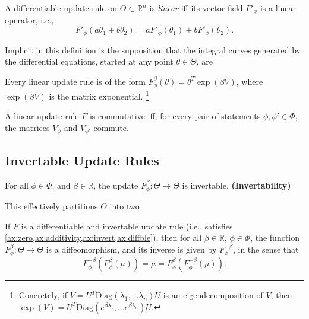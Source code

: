 \documentclass{article}
\begin{document}
\begin{defn}\label{ax:linear}
    A differentiable update rule on $\Theta \subset \mathbb R^n$ is \emph{linear} iff its vector field $F'_\phi$ is a linear operator, i.e., 
    \[ F'_\phi(a \theta_1 + b \theta_2) = a F'_\phi(\theta_1) + b F'_\phi(\theta_2). \]
\end{defn}

Implicit in this definition is the supposition that the integral curves generated by the differential equations, started at any point $\theta \in \Theta$, are 


\begin{prop}
    Every linear update rule is of the form
    $
        F^{\beta}_\phi(\theta) =  \theta^{T} \exp(\beta V)
    $,
    where $\exp(\beta V)$ is the matrix exponential.%
        \footnote{Concretely, if $V = U^T \mathrm{Diag}(\lambda_1, \ldots \lambda_n) U$ is an eigendecomposition of $V$, then $\exp(V) = U^T \mathrm{Diag}(e^{\beta\lambda_1}, \ldots e^{\beta\lambda_n}) U$.}
\end{prop}

\begin{prop}
    A linear update rule $F$ is commutative iff, for every pair of statements  $\phi, \phi' \in \Phi$, the
    matrices $V_\phi$ and $V_{\phi'}$ commute.
\end{prop}



\subsection{Invertable Update Rules}
\begin{URaxioms}
    \item For all $\phi\in\Phi$, and $\beta \in \mathbb R$, the update
    $F^{\beta}_{\phi}: \Theta \to \Theta$ is invertable.
    \hfill\textbf{(Invertability)} \label{ax:invert}
\end{URaxioms}


This effectively partitions $\Theta$ into two 


\begin{prop}
    If $F$ is a differentiable and invertable update rule (i.e., satisfies \cref{ax:zero,ax:additivity,ax:invert,ax:diffble}), then for all $\beta \in \mathbb R$, $\phi \in \Phi$, the function
    $F^\beta_\phi : \Theta \to \Theta$
    is a diffeomorphism, and its inverse is given by $F^{-\beta}_\phi$, in the sense that
    \[
        F^{-\beta}_\phi( F^{\beta}_\phi (\mu) ) = \mu = F^{\beta}_\phi( F^{-\beta}_\phi (\mu) ).
     \]
\end{prop}
\end{document}
